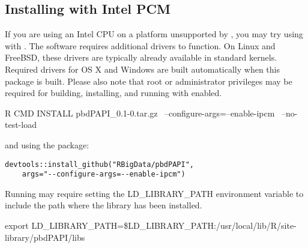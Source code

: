 \subsection{Installing with Intel PCM}

If you are using an Intel CPU on a platform unsupported by \PAPI, you may try using 
\IPCM with \thispackage.  The \IPCM software requires additional drivers to function.
On Linux and FreeBSD, these drivers are typically already available in standard kernels.
Required drivers for OS X and Windows are built automatically when this package is built.
Please also note that root or administrator privileges may be required for building,
installing, and running \thispackage with \IPCM enabled.

\begin{Command}
R CMD INSTALL pbdPAPI_0.1-0.tar.gz \ 
    --configure-args=--enable-ipcm \ 
    --no-test-load
\end{Command}
and using the  package:
\begin{lstlisting}
devtools::install_github("RBigData/pbdPAPI", 
    args="--configure-args=--enable-ipcm")
\end{lstlisting}

Running \thispackage may require setting the LD\_LIBRARY\_PATH environment variable to
include the path where the \IPCM library has been installed.
\begin{Command}
	export LD_LIBRARY_PATH=\$LD_LIBRARY_PATH:/usr/local/lib/R/site-library/pbdPAPI/libs
\end{Command}

